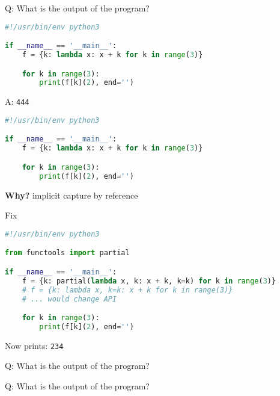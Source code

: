 \begin{frame}[fragile]{Q: What is the output of the program?}
    \begin{lstlisting}[language=python]
#!/usr/bin/env python3

if __name__ == '__main__':
    f = {k: lambda x: x + k for k in range(3)}

    for k in range(3):
        print(f[k](2), end='')
    \end{lstlisting}
\end{frame}

\addtocounter{framenumber}{-1}
\begin{frame}[fragile]{A: \texttt{444}}
    \begin{lstlisting}[language=python]
#!/usr/bin/env python3

if __name__ == '__main__':
    f = {k: lambda x: x + k for k in range(3)}

    for k in range(3):
        print(f[k](2), end='')
    \end{lstlisting}

    \hfill \textbf{Why?} implicit capture by reference
\end{frame}

\begin{frame}[fragile]{Fix}
    \begin{lstlisting}[language=python]
#!/usr/bin/env python3

from functools import partial

if __name__ == '__main__':
    f = {k: partial(lambda x, k: x + k, k=k) for k in range(3)}
    # f = {k: lambda x, k=k: x + k for k in range(3)}
    # ... would change API

    for k in range(3):
        print(f[k](2), end='')
    \end{lstlisting}
    
    Now prints: \texttt{234}
\end{frame}

\begin{frame}[fragile]{Q: What is the output of the program?}

\end{frame}

\begin{frame}[fragile]{Q: What is the output of the program?}
\end{frame}


